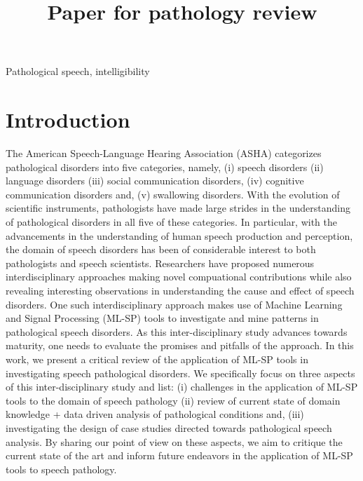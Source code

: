 \documentclass{article}
\title{Paper for pathology review}
\begin{document}
\ninept
%
\maketitle
%
\begin{abstract}
 
\end{abstract}
%
\begin{keywords}
Pathological speech, intelligibility 
\end{keywords}
%
\section{Introduction}
\label{sec:intro}
The American Speech-Language Hearing Association (ASHA) \cite{american2008council} categorizes pathological disorders into five categories, namely, (i) speech disorders (ii) language disorders (iii) social communication disorders, (iv) cognitive communication disorders and, (v) swallowing disorders.
With the evolution of scientific instruments, pathologists have made large strides in the understanding of pathological disorders in all five of these categories.
In particular, with the advancements in the understanding of human speech production and perception, the domain of speech disorders has been of considerable interest to both pathologists and speech scientists. 
Researchers have proposed numerous interdisciplinary approaches making novel compuational contributions while also revealing interesting observations in understanding the cause and effect of speech disorders. 
One such interdisciplinary approach makes use of Machine Learning and Signal Processing (ML-SP) tools to investigate and mine patterns in pathological speech disorders.
As this inter-disciplinary study advances towards maturity, one needs to evaluate the promises and pitfalls of the approach.
In this work, we present a critical review of the application of ML-SP tools in investigating speech pathological disorders. 
We specifically focus on three aspects of this inter-disciplinary study and list: (i) challenges in the application of ML-SP tools to the domain of speech pathology (ii) review of current state of domain knowledge + data driven analysis of pathological conditions and, (iii) investigating the design of case studies directed towards pathological speech analysis. 
By sharing our point of view on these aspects, we aim to critique the current state of the art and inform future endeavors in the application of ML-SP tools to speech pathology. 
\end{document}
